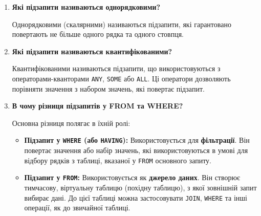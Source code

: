 \documentclass{article}
\begin{document}
\begin{enumerate}[label=\arabic*., leftmargin=*]
        Стандартні оператори порівняння, які очікують, що підзапит поверне одне скалярне значення:
        \texttt{=}, \texttt{<>} (\texttt{!=}), \texttt{>}, \texttt{<}, \texttt{>=}, \texttt{<=}.

        \item \textbf{Які підзапити називаються однорядковими?}
        
        Однорядковими (скалярними) називаються підзапити, які гарантовано повертають не більше одного рядка та одного стовпця.

        \item \textbf{Які підзапити називаються квантифікованими?}
        
        Квантифікованими називаються підзапити, що використовуються з операторами-кванторами \texttt{ANY}, \texttt{SOME} або \texttt{ALL}. Ці оператори дозволяють порівняти значення з набором значень, які повертає підзапит.

        \item \textbf{В чому різниця підзапитів у FROM та WHERE?}
        
        Основна різниця полягає в їхній ролі:
        \begin{itemize}
            \item \textbf{Підзапит у \texttt{WHERE} (або \texttt{HAVING}):} Використовується для \textbf{фільтрації}. Він повертає значення або набір значень, які використовуються в умові для відбору рядків з таблиці, вказаної у \texttt{FROM} основного запиту.
            \item \textbf{Підзапит у \texttt{FROM}:} Використовується як \textbf{джерело даних}. Він створює тимчасову, віртуальну таблицю (похідну таблицю), з якої зовнішній запит вибирає дані. До цієї таблиці можна застосовувати \texttt{JOIN}, \texttt{WHERE} та інші операції, як до звичайної таблиці.
        \end{itemize}
    \end{enumerate}
\end{document}
